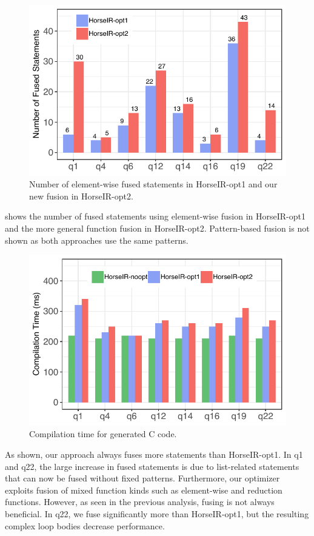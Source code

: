 \begin{figure}[htbp]
\centering
\includegraphics[width=.8\columnwidth]{./src/figure/bar-number.pdf}
\vspace{-3mm}
\caption{Number of element-wise fused statements in HorseIR-opt1 and our new
fusion in HorseIR-opt2.}
\label{fig:opt_number}
\end{figure}

 shows the number of fused statements using
element-wise fusion in HorseIR-opt1 and the more general function fusion in
HorseIR-opt2. Pattern-based fusion is not shown as both approaches use the
same patterns. 

\begin{figure}[htbp]
\centering
\includegraphics[width=.85\columnwidth]{./src/figure/compile-time.pdf}
\vspace{-3mm}
\caption{Compilation time for generated C code.}
\label{fig:compilation_time}
\end{figure}


As shown, our approach always fuses more statements than HorseIR-opt1.
In q1 and q22, the large increase in fused statements is due to list-related
statements that can now be fused without fixed patterns. Furthermore, our optimizer
exploits fusion of mixed function kinds such as element-wise and reduction functions.
However, as seen in the previous analysis, fusing is not always beneficial. In q22,
we fuse significantly more than HorseIR-opt1, but the resulting complex loop
bodies decrease performance.

